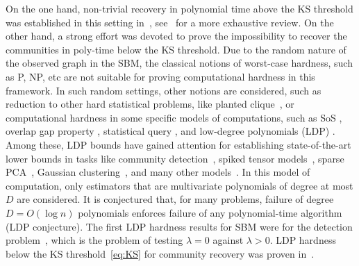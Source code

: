 \documentclass[final]{colt2026}
\newcommand{\1}{\mathbf{1}}
\begin{document}
On the one hand, non-trivial recovery in polynomial time above the KS threshold was established in this setting in~\cite{massoulie2014community,mossel2018proof,bordenave2015non,AbbeSandon2015a,pmlr-v291-chin25a}, see~\cite{AbbeReview2018} for a more exhaustive review.
On the other hand, a strong effort was devoted to prove the impossibility to recover the communities in poly-time below the KS threshold. 
Due to the random nature of the observed graph in the SBM, the classical notions of worst-case hardness, such as P, NP, etc are not suitable for proving computational hardness in this framework. 
In such random settings, other notions are considered, such as reduction to other hard statistical problems, like planted clique~\cite{brennan2020reducibility,pmlr-v30-Berthet13,brennan2018reducibility}, or computational hardness in some specific models of computations, such as SoS \cite{HopkinsFOCS17,Barak19}, overlap gap property \cite{gamarnik2021overlap}, statistical query \cite{kearns1998efficient,brennan2020statistical}, and low-degree polynomials (LDP) \cite{hopkins2018statistical,KuniskyWeinBandeira,SchrammWein22,SohnWein25}. Among these, LDP bounds have gained attention for establishing state-of-the-art lower bounds in tasks like community detection~\cite{Hopkins17},  spiked tensor models~\cite{Hopkins17,KuniskyWeinBandeira}, sparse PCA~\cite{ding2024subexponential}, Gaussian clustering~\cite{Even25a}, and many other models~\cite{SurveyWein2025}. In this model of computation, only estimators that are multivariate polynomials of degree at most $D$ are considered. It is conjectured that, for many problems, failure of degree $D = O(\log n)$ polynomials enforces failure of any polynomial-time algorithm~\cite{KuniskyWeinBandeira} (LDP conjecture). 
The first LDP hardness results  for SBM were for the detection problem~\cite{Hopkins17,bandeira2021spectral,kunisky2024low}, which is the problem of testing $\lambda=0$ against $\lambda>0$.
LDP hardness below the KS threshold~\eqref{eq:KS} for community recovery was proven  in~\cite{luo2023computational, SohnWein25, ding2025low}.  
\end{document}
